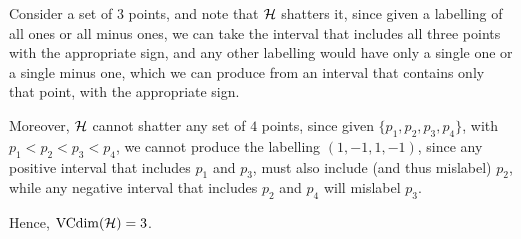 \begin{ex}
\end{ex}

\begin{ex}
  Consider a set of $3$ points, and note that $\mathcal{H}$ shatters it, since given a
  labelling of all ones or all minus ones, we can take the interval that
  includes all three points with the appropriate sign, and any other labelling
  would have only a single one or a single minus one, which we can produce from
  an interval that contains only that point, with the appropriate sign.

  Moreover, $\mathcal{H}$ cannot shatter any set of $4$ points, since given
  $\{p_1,p_2,p_3,p_4\}$, with $p_1<p_2<p_3<p_4$, we cannot produce the labelling
  $(1,-1,1,-1)$, since any positive interval that includes $p_1$ and $p_3$, must
  also include (and thus mislabel) $p_2$, while any negative interval that
  includes $p_2$ and $p_4$ will mislabel $p_3$.

  Hence, $\operatorname*{VCdim}(\mathcal{H})=3$.
\end{ex}

\begin{ex}
\end{ex}

\begin{ex}
\end{ex}

\begin{ex}
\end{ex}